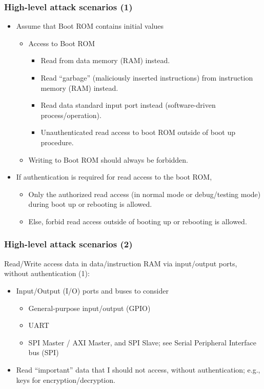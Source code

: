 \documentclass[xcolor={usenames,dvipsnames},hyperref={hyperindex,bookmarks}]{beamer}
\begin{document}
\frame
{
	\frametitle{High-level attack scenarios (1)}

	\begin{itemize}
	\item Assume that Boot ROM contains initial values
		\begin{itemize}
		\item Access to Boot ROM
			\begin{itemize}
			\item Read from data memory (RAM) instead.
			\item Read ``garbage'' (maliciously inserted instructions) from instruction memory (RAM) instead.
			\item Read data standard input port instead (software-driven process/operation).
			\item Unauthenticated read access to boot ROM outside of boot up procedure.
			\end{itemize}
		\item Writing to Boot ROM should always be forbidden.
		\end{itemize}
	\item If authentication is required for read access to the boot ROM, 
		\begin{itemize}
		\item Only the authorized read access (in normal mode or debug/testing mode) during boot up or rebooting is allowed.
		\item Else, forbid read access outside of booting up or rebooting is allowed.
		\end{itemize}
	\end{itemize}
}


\frame
{
	\frametitle{High-level attack scenarios (2)}

	Read/Write access data in data/instruction RAM via input/output ports, without authentication (1):
	\begin{itemize}
	\item Input/Output (I/O) ports and buses to consider
		\begin{itemize}
		\item General-purpose input/output (GPIO)
		\item UART
		\item SPI Master / AXI Master, and SPI Slave; see Serial Peripheral Interface bus (SPI)
		\end{itemize}
	\item Read ``important'' data that I should not access, without authentication; e.g., keys for encryption/decryption.
	\end{itemize}
}
\end{document}
